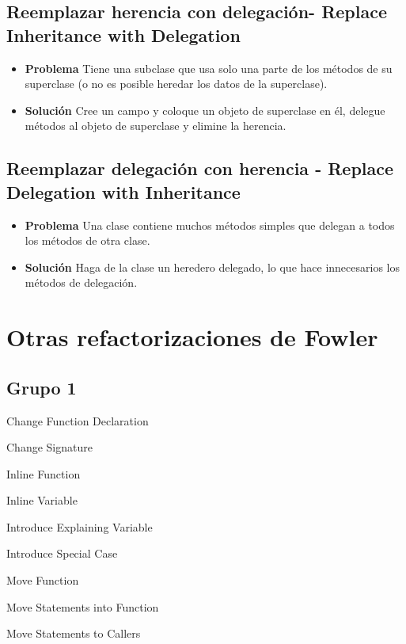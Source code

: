 \documentclass[11pt,a4paper,oneside]{book}
\begin{document}
\subsection{Reemplazar herencia con delegación- Replace Inheritance with Delegation}
\label{renombrarmetodo}
\begin{itemize}
    \item \textbf{Problema} Tiene una subclase que usa solo una parte de los métodos de su superclase (o no es posible heredar los datos de la superclase).
    \item \textbf{Solución} Cree un campo y coloque un objeto de superclase en él, delegue métodos al objeto de superclase y elimine la herencia.
\end{itemize}

\subsection{Reemplazar delegación con herencia - Replace Delegation with Inheritance}
\label{renombrarmetodo}
\begin{itemize}
    \item \textbf{Problema} Una clase contiene muchos métodos simples que delegan a todos los métodos de otra clase.
    \item \textbf{Solución} Haga de la clase un heredero delegado, lo que hace innecesarios los métodos de delegación.
\end{itemize}



\section{Otras refactorizaciones de Fowler}
\subsection{Grupo 1}
Change Function Declaration

Change Signature 

Inline Function

Inline Variable

Introduce Explaining Variable

Introduce Special Case

Move Function

Move Statements into Function

Move Statements to Callers
\end{document}
